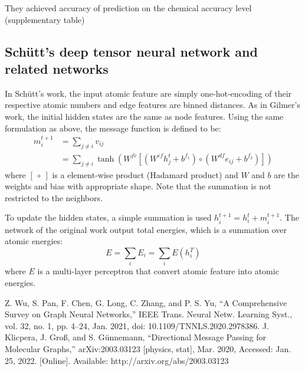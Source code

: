 \documentclass{article}
\begin{document}
They achieved accuracy of prediction on the chemical accuracy level (supplementary table)

\subsection{Sch\"{u}tt's deep tensor neural network and related networks}
In Sch\"{u}tt's work, the input atomic feature are simply one-hot-encoding of their
respective atomic numbers and edge features are binned distances. 
As in Gilmer's work, the initial hidden states are the same as node features.
Using the same formulation as above, the message function is defined to be:
\begin{align}
    m_i^{t+1} &= \sum_{j\neq i} v_{ij} \\
            &= \sum_{j\neq i} \tanh \left( W^{fc}[ (W^{cf} h_j^t + b^{f_1}) \circ (W^{df} e_{ij} + b^{f_2}) ] \right)
\end{align}
where $[\ \circ\ ]$ is a element-wise product (Hadamard product) and $W$ and $b$ are the weights and bias with appropriate shape. 
Note that the summation is not restricted to the neighbors. 

To update the hidden states, a simple summation is used $h_i^{t+1} = h_i^t + m_i^{t+1}$. 
The network of the original work output total energies, which is a summation over atomic energies:
\begin{equation}
    E = \sum_i E_i = \sum_i E(h_i^T)
\end{equation}
where $E$ is a multi-layer perceptron that convert atomic feature into atomic energies.


\begin{thebibliography}{99}
    Z. Wu, S. Pan, F. Chen, G. Long, C. Zhang, and P. S. Yu, “A Comprehensive Survey on Graph Neural Networks,” IEEE Trans. Neural Netw. Learning Syst., vol. 32, no. 1, pp. 4–24, Jan. 2021, doi: 10.1109/TNNLS.2020.2978386.
    J. Klicpera, J. Groß, and S. Günnemann, “Directional Message Passing for Molecular Graphs,” arXiv:2003.03123 [physics, stat], Mar. 2020, Accessed: Jan. 25, 2022. [Online]. Available: http://arxiv.org/abs/2003.03123
\end{thebibliography}
\end{document}
